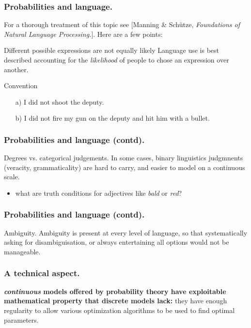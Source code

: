 \documentclass{beamer}
\begin{document}
\begin{frame}
  \frametitle{Probabilities and language.}
  For a thorough treatment of this topic see [Manning \& Sch\"utze, \emph{Foundations of Natural Language Processing.}]. Here are a few points: 

  \begin{block}{Different possible expressions are not equally likely}
    Language use is best described accounting for the \emph{likelihood} of people to chose an expression over another.
  \end{block}

  \begin{exampleblock}{Convention}
    \begin{itemize}
    \item[a)] I did not shoot the deputy.
    \item[b)] I did not fire my gun on the deputy and hit him with a bullet.
    \end{itemize}
  \end{exampleblock}
\end{frame}

\begin{frame}
  \frametitle{Probabilities and language (contd).}
  
  \begin{block}{Degrees vs. categorical judgements.}
    In some cases, binary linguistics judgmnents (veracity, grammaticality) are hard to carry, and easier to model on a continuous scale.
    \begin{itemize}
    \item what are truth conditions for adjectives like \emph{bald} or \emph{red}?
    \end{itemize}
  \end{block}
\end{frame}

\begin{frame}
  \frametitle{Probabilities and language (contd).}
  \begin{block}{Ambiguity.}
    Ambiguity is present at every level of language, so that systematically asking for disambiguisation, or always entertaining all options would not be manageable.
  \end{block}
\end{frame}

\begin{frame}
  \frametitle{A technical aspect.}
             {\bf \emph{continuous} models offered by probability theory have exploitable mathematical property that discrete models lack: } they have enough regularity to allow various optimization algorithms to be used to find optimal parameters.
\end{frame}
\end{document}
